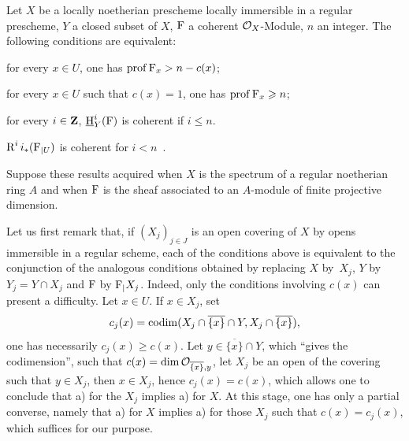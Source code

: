 \begin{corollary} \label{VIII.2.3} Let $X$ be a locally noetherian prescheme locally immersible in a regular prescheme, $Y$ a closed subset of $X$, ${\operatorname{F}}$ a coherent $\mathcal{O}_X$-Module, $n$ an integer. The following conditions are equivalent:
\begin{enumeratei}
\item
for every $x\in U$, one has $\operatorname{prof} {\operatorname{F}}_x>n-c(x)$;
\item
for every $x\in U$ such that $c(x)=1$, one has $\operatorname{prof} {\operatorname{F}}_x\geqslant n$;
\item
for every $i\in \mathbf{Z}$, $\operatorname{\underline{H}}^i_Y({\operatorname{F}})$ is coherent if $i\leq n$.
\item
$\operatorname{R}^ii_\ast({\operatorname{F}}_{|U})$ is coherent for $i<n$\ .
\end{enumeratei}
\end{corollary}

Suppose these results acquired when $X$ is the spectrum of a regular noetherian ring $A$ and when ${\operatorname{F}}$ is the sheaf associated to an $A$-module of finite projective dimension.

Let us first remark that, if $(X_j)_{j\in
J}$ is an open covering of $X$ by opens
immersible in a regular scheme, each of the conditions
above is equivalent to the conjunction of the analogous
conditions obtained by replacing $X$ by~$X_j$, $Y$ by
$Y_j=Y\cap X_j$ and ${\operatorname{F}}$ by
${\operatorname{F}}_|X_j$. Indeed, only the conditions
involving $c(x)$ can present a difficulty. Let $x\in
U$. If $x\in X_j$, set
\[
c_j(x)=\operatorname{codim}(X_j\cap \overline{\{x\}}\cap Y, X_j\cap\overline{\{x\}}),
\]
one has necessarily $c_j(x)\geq c(x)$. Let $y\in
\overline{\{x\}}\cap Y$, which ``gives the codimension'', \ie such
that $c(x)=\dim {\mathcal O}_{\overline{\{x\}}, y}$, let $X_j$ be an open of the
covering such that $y\in X_j$, then $x\in X_j$, hence
$c_j(x)=c(x)$, which allows one to conclude that a) for the
$X_j$ implies a) for $X$. At this stage, one has only a
partial converse, namely that a) for $X$ implies a) for
those $X_j$ such that $c(x)=c_j(x)$, which suffices for our
purpose.

